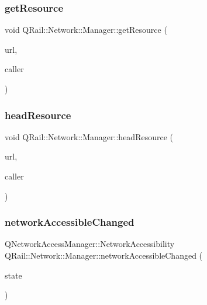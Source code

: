 \subsubsection{\texorpdfstring{getResource}{getResource}}
{\footnotesize\ttfamily void Q\+Rail\+::\+Network\+::\+Manager\+::get\+Resource (\begin{DoxyParamCaption}\item[{const Q\+Url \&}]{url,  }\item[{Q\+Object $\ast$}]{caller }\end{DoxyParamCaption})\hspace{0.3cm}{\ttfamily [slot]}}

\mbox{\label{classQRail_1_1Network_1_1Manager_adde10f409e9b77b59b145fd2609244a7}} 
\subsubsection{\texorpdfstring{headResource}{headResource}}
{\footnotesize\ttfamily void Q\+Rail\+::\+Network\+::\+Manager\+::head\+Resource (\begin{DoxyParamCaption}\item[{const Q\+Url \&}]{url,  }\item[{Q\+Object $\ast$}]{caller }\end{DoxyParamCaption})\hspace{0.3cm}{\ttfamily [slot]}}

\mbox{\label{classQRail_1_1Network_1_1Manager_af81d89d8572d74d039400ec2e05f9894}} 
\subsubsection{\texorpdfstring{networkAccessibleChanged}{networkAccessibleChanged}}
{\footnotesize\ttfamily Q\+Network\+Access\+Manager\+::\+Network\+Accessibility Q\+Rail\+::\+Network\+::\+Manager\+::network\+Accessible\+Changed (\begin{DoxyParamCaption}\item[{Q\+Network\+Access\+Manager\+::\+Network\+Accessibility}]{state }\end{DoxyParamCaption})\hspace{0.3cm}{\ttfamily [signal]}}

